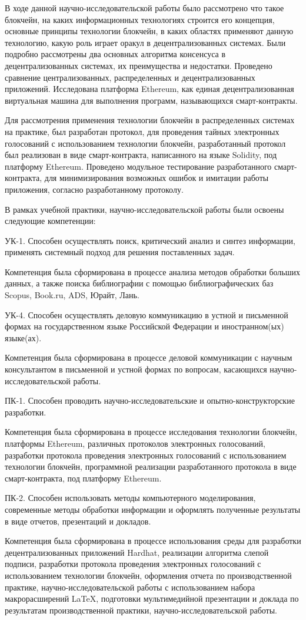 \conclusion

В ходе данной научно-исследовательской работы было рассмотрено что такое блокчейн, на каких информационных технологиях строится его концепция, основные принципы технологии блокчейн, в каких областях применяют данную технологию, какую роль играет оракул в децентрализованных системах. Были подробно рассмотрены два основных алгоритма консенсуса в децентрализованных системах, их преимущества и недостатки. Проведено сравнение централизованных, распределенных и децентрализованных приложений. Исследована платформа Ethereum, как единая децентрализованная виртуальная машина для выполнения программ, называющихся смарт-контракты.

Для рассмотрения применения технологии блокчейн в распределенных системах на практике, был разработан протокол, для проведения тайных электронных голосований с использованием технологии блокчейн, разработанный протокол был реализован в виде смарт-контракта, написанного на языке Solidity, под платформу Ethereum. Проведено модульное тестирование разработанного смарт-контракта, для минимизирования возможных ошибок и имитации работы приложения, согласно разработанному протоколу.

В рамках учебной практики, научно-исследовательской работы были освоены следующие компетенции:

УК-1. Способен осуществлять поиск, критический анализ и синтез информации, применять системный подход для решения поставленных задач.

Компетенция была сформирована в процессе анализа методов обработки больших данных, а также поиска библиографии с помощью библиографических баз Scopus, Book.ru, ADS, Юрайт, Лань.

УК-4. Способен осуществлять деловую коммуникацию в устной и письменной формах на государственном языке Российской Федерации и иностранном(ых) языке(ах).

Компетенция была сформирована в процессе деловой коммуникации с научным консультантом в письменной и устной формах по вопросам, касающихся научно-исследовательской работы.

ПК-1. Способен проводить научно-исследовательские и опытно-конструкторские разработки.

Компетенция была сформирована в процессе исследования технологии блокчейн, платформы Ethereum, различных протоколов электронных голосований, разработки протокола проведения электронных голосований с использованием технологии блокчейн, программной реализации разработанного протокола в виде смарт-контракта, под платформу Ethereum.

ПК-2. Способен использовать методы компьютерного моделирования, современные методы обработки информации и оформлять полученные результаты в виде отчетов, презентаций и докладов.

Компетенция была сформирована в процессе использования среды для разработки децентрализованных приложений Hardhat, реализации алгоритма слепой подписи, разработки протокола проведения электронных голосований с использованием технологии блокчейн, оформления отчета по производственной практике, научно-исследовательской работы с использованием набора макрорасширений \LaTeX, подготовки мультимедийной презентации и доклада по результатам производственной практики, научно-исследовательской работы.